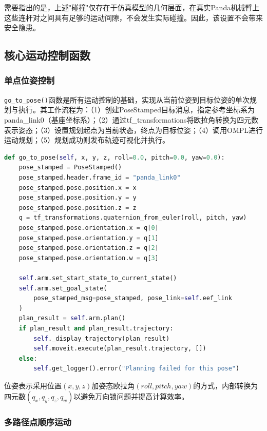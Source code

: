 \documentclass[a4paper,12pt]{ctexart}
\newcommand{\bodytext}{\fontsize{12pt}{20pt}\selectfont\setlength{\parskip}{0pt}}
\begin{document}
需要指出的是，上述"碰撞"仅存在于仿真模型的几何层面，在真实Panda机械臂上这些连杆对之间具有足够的运动间隙，不会发生实际碰撞。因此，该设置不会带来安全隐患。

\subsection{核心运动控制函数}

\subsubsection{单点位姿控制}

\bodytext

\texttt{go\_to\_pose()}函数是所有运动控制的基础，实现从当前位姿到目标位姿的单次规划与执行。其工作流程为：（1）创建PoseStamped目标消息，指定参考坐标系为panda\_link0（基座坐标系）；（2）通过tf\_transformations将欧拉角转换为四元数表示姿态；（3）设置规划起点为当前状态，终点为目标位姿；（4）调用OMPL进行运动规划；（5）规划成功则发布轨迹可视化并执行。

\begin{lstlisting}[language=Python, caption={单点位姿控制核心代码}]
def go_to_pose(self, x, y, z, roll=0.0, pitch=0.0, yaw=0.0):
    pose_stamped = PoseStamped()
    pose_stamped.header.frame_id = "panda_link0"
    pose_stamped.pose.position.x = x
    pose_stamped.pose.position.y = y
    pose_stamped.pose.position.z = z
    q = tf_transformations.quaternion_from_euler(roll, pitch, yaw)
    pose_stamped.pose.orientation.x = q[0]
    pose_stamped.pose.orientation.y = q[1]
    pose_stamped.pose.orientation.z = q[2]
    pose_stamped.pose.orientation.w = q[3]

    self.arm.set_start_state_to_current_state()
    self.arm.set_goal_state(
        pose_stamped_msg=pose_stamped, pose_link=self.eef_link
    )
    plan_result = self.arm.plan()
    if plan_result and plan_result.trajectory:
        self._display_trajectory(plan_result)
        self.moveit.execute(plan_result.trajectory, [])
    else:
        self.get_logger().error("Planning failed for this pose")
\end{lstlisting}

位姿表示采用位置$(x, y, z)$加姿态欧拉角$(roll, pitch, yaw)$的方式，内部转换为四元数$(q_x, q_y, q_z, q_w)$以避免万向锁问题并提高计算效率。

\subsubsection{多路径点顺序运动}
\end{document}
